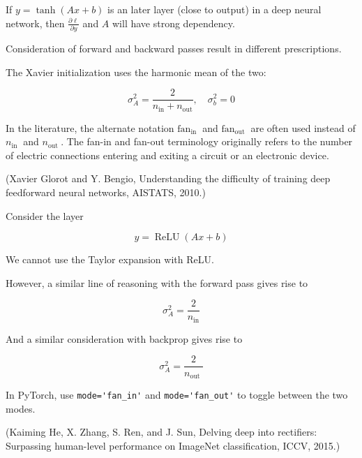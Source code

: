 \documentclass{report}
\begin{document}
\begin{definition}
    If $y=\tanh (A x+b)$ is an later layer (close to output) in a deep neural network, then $\frac{\partial \ell}{\partial y}$ and $A$ will have strong dependency.

    \par\noindent\textcolor{gray}{\hdashrule{\textwidth}{0.4pt}{1pt 2pt}}

    Consideration of forward and backward passes result in different prescriptions.

    The Xavier initialization uses the harmonic mean of the two:

    $$
    \sigma_{A}^{2}=\frac{2}{n_{\mathrm{in}}+n_{\mathrm{out}}}, \quad \sigma_{b}^{2}=0
    $$

    In the literature, the alternate notation $\text{fan}_{\text {in }}$ and $\text{fan}_{\text {out }}$ are often used instead of $n_{\text {in }}$ and $n_{\text {out }}$. The fan-in and fan-out terminology originally refers to the number of electric connections entering and exiting a circuit or an electronic device.

    (Xavier Glorot and Y. Bengio, Understanding the difficulty of training deep feedforward neural networks, AISTATS, 2010.)
\end{definition}

\begin{definition}
    Consider the layer

    $$
    y=\operatorname{ReLU}(A x+b)
    $$

    We cannot use the Taylor expansion with ReLU.

    However, a similar line of reasoning with the forward pass gives rise to

    $$
    \sigma_{A}^{2}=\frac{2}{n_{\mathrm{in}}}
    $$

    And a similar consideration with backprop gives rise to

    $$
    \sigma_{A}^{2}=\frac{2}{n_{\text {out }}}
    $$

    In PyTorch, use \verb|mode='fan_in'| and \verb|mode='fan_out'| to toggle between the two modes.

    (Kaiming He, X. Zhang, S. Ren, and J. Sun, Delving deep into rectifiers: Surpassing human-level performance on ImageNet classification, ICCV, 2015.)
\end{definition}
\end{document}
